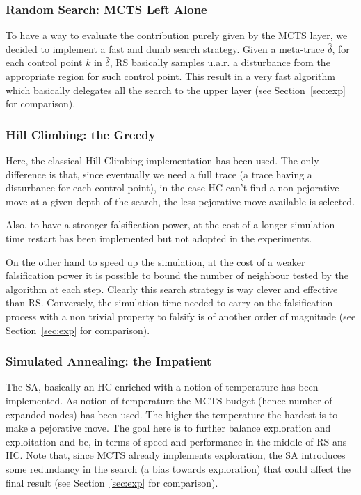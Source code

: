 \documentclass[11pt]{article}
\begin{document}
\subsubsection{Random Search: MCTS Left Alone}
To have a way to evaluate the contribution purely given by the MCTS layer, we decided to implement a fast and dumb search strategy.
Given a meta-trace $\hat{\delta}$, for each control point $k$ in $\hat{\delta}$, RS basically samples u.a.r. a disturbance from the appropriate region for such control point.
This result in a very fast algorithm which basically delegates all the search to the upper layer (see Section~\ref{sec:exp} for comparison). 

\subsubsection{Hill Climbing: the Greedy}
Here, the classical Hill Climbing implementation has been used. The only difference is that, since eventually we need a full trace (a trace having a disturbance for each control point), in the case HC can't find a non pejorative move at a given depth of the search, the less pejorative move available is selected. 

Also, to have a stronger falsification power, at the cost of a longer simulation time restart has been implemented but not adopted in the experiments. 

On the other hand to speed up the simulation, at the cost of a weaker falsification power it is possible to bound the number of
neighbour tested by the algorithm at each step. 
Clearly this search strategy is way clever and effective than RS. Conversely, the simulation time needed to carry on the falsification process with a non trivial property to falsify is of another order of magnitude (see Section~\ref{sec:exp} for comparison).

\subsubsection{Simulated Annealing: the Impatient}
The SA, basically an HC enriched with a notion of temperature has been implemented. As notion of temperature the MCTS budget (hence number of expanded nodes) has been used. The higher the temperature the hardest is to make a pejorative move. 
The goal here is to further balance exploration and exploitation and be, in terms of speed and performance in the middle of RS ans HC.
Note that, since MCTS already implements exploration, the SA introduces some redundancy in the search (a bias towards exploration) that could affect the final result (see Section~\ref{sec:exp} for comparison).
\end{document}
